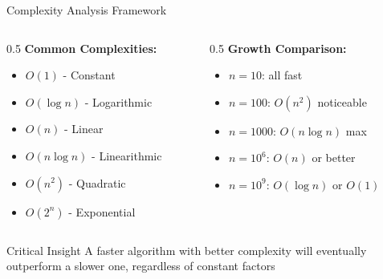 \documentclass[aspectratio=169,xcolor=dvipsnames]{beamer}
\begin{document}
\begin{frame}{Complexity Analysis Framework}
  \begin{columns}
    \begin{column}{0.5\textwidth}
      \textbf{Common Complexities:}
      \begin{itemize}
        \item $O(1)$ - Constant
        \item $O(\log n)$ - Logarithmic
        \item $O(n)$ - Linear
        \item $O(n \log n)$ - Linearithmic
        \item $O(n^2)$ - Quadratic
        \item $O(2^n)$ - Exponential
      \end{itemize}
    \end{column}

    \begin{column}{0.5\textwidth}
      \textbf{Growth Comparison:}
      \begin{itemize}
        \item $n = 10$: all fast
        \item $n = 100$: $O(n^2)$ noticeable
        \item $n = 1000$: $O(n \log n)$ max
        \item $n = 10^6$: $O(n)$ or better
        \item $n = 10^9$: $O(\log n)$ or $O(1)$
      \end{itemize}
    \end{column}
  \end{columns}

  \vspace{0.3cm}
  \begin{alertblock}{Critical Insight}
    A faster algorithm with better complexity will eventually outperform a slower one, regardless of constant factors
  \end{alertblock}
\end{frame}
\end{document}
